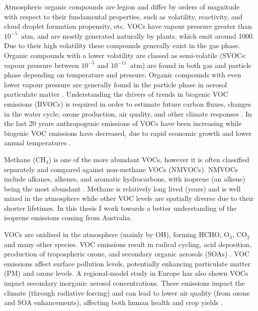   Atmospheric organic compounds are legion and differ by orders of magnitude with respect to their fundamental properties, such as volatility, reactivity, and cloud droplet formation propensity, etc.
  VOCs have vapour pressure greater than $10^{-5}$~atm, and are mostly generated naturally by plants, which emit around 1000\tgpyr \parencite{Guenther1995, Glasius2016}.
  Due to their high volatility these compounds generally exist in the gas phase.
  Organic compounds with a lower volatility are classed as semi-volatile (SVOCs: vapour pressure between $10^{-5}$ and $10^{-11}$~atm) are found in both gas and particle phase depending on temperature and pressure.
  Organic compounds with even lower vapour pressure are generally found in the particle phase in aerosol particulate matter \parencite{Glasius2016}.
  Understanding the drivers of trends in biogenic VOC emissions (BVOCs) is required in order to estimate future carbon fluxes, changes in the water cycle, ozone production, air quality, and other climate responses \parencite{Yue2015}.
  In the last 20 years anthropogenic emissions of VOCs have been increasing while biogenic VOC emissions have decreased, due to rapid economic growth and lower annual temperatures \parencite{Stavrakou2014, Kwon2017}.
  
  Methane (CH$_4$) is one of the more abundant VOCs, however it is often classified separately and compared against non-methane VOCs (NMVOCs).
  NMVOCs include alkanes, alkenes, and aromatic hydrocarbons, with isoprene (an alkene) being the most abundant \parencite{Guenther1995}.
  Methane is relatively long lived (years) and is well mixed in the atmosphere while other VOC levels are spatially diverse due to their shorter lifetimes.
  In this thesis I work towards a better understanding of the isoprene emissions coming from Australia.

  VOCs are oxidised in the atmosphere (mainly by OH), forming HCHO, O$_3$, CO$_2$ and many other species.
  VOC emissions result in radical cycling, acid deposition, production of tropospheric ozone, and secondary organic aerosols (SOAs) \parencite{Atkinson2000, Kanakidou2005}.
  VOC emissions affect surface pollution levels, potentially enhancing particulate matter (PM) and ozone levels.
  A regional-model study in Europe \parencite{Aksoyoglu2017} has also shown VOCs impact secondary inorganic aerosol concentrations.
  These emissions impact the climate (through radiative forcing) and can lead to lower air quality (from ozone and SOA enhancements), affecting both human health and crop yields \parencite{IPCC_Chapter2, Avnery2011, Lelieveld2015}.
  
